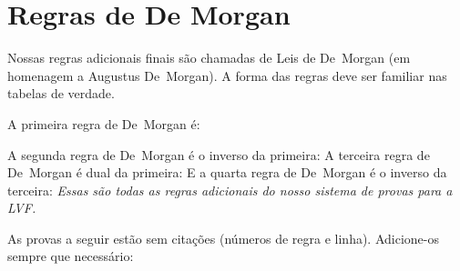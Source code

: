 
\section{Regras de De Morgan}
Nossas regras adicionais finais s\~ao chamadas de Leis de De~Morgan (em homenagem a Augustus De~Morgan). A forma das regras deve ser familiar nas tabelas de verdade.

 A primeira regra de De~Morgan \'e:
 
A segunda regra de De~Morgan \'e o inverso da primeira:
A terceira regra de De~Morgan \'e dual da primeira:
E a quarta regra de De~Morgan \'e o inverso da terceira:
\emph{Essas s\~ao todas as regras adicionais do nosso sistema de provas para a  LVF.}

\practiceproblems
\solutions
\problempart
\label{pr.justifyTFLproof}
As provas a seguir est\~ao sem cita\c c\~oes (n\'umeros de regra e linha). Adicione-os sempre que necess\'ario:

